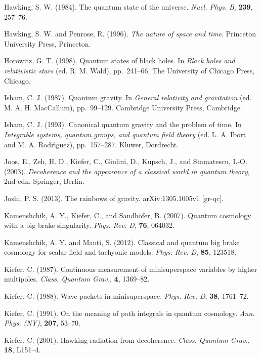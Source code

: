 \documentclass[12pt]{article}
\begin{document}
\bibitem{} Hawking, S. W. (1984). The quantum state of the universe.
           {\em Nucl. Phys. B}, {\bf 239}, 257--76.

\bibitem{} Hawking, S. W. and Penrose, R. (1996). {\em The nature
           of space and time}. Princeton University Press, Princeton.

\bibitem{} Horowitz, G. T. (1998). Quantum states of black holes. 
           In {\em Black holes and relativistic stars} (ed. R. M. Wald),
           pp.~241--66. The University of Chicago Press, Chicago.


\bibitem{} Isham, C. J. (1987). Quantum gravity. In {\em General
           relativity and gravitation}
           (ed. M. A. H. MacCallum), pp.~99--129. Cambridge University
           Press, Cambridge.

\bibitem{} Isham, C. J. (1993). Canonical quantum gravity and the problem of
           time. In {\em Integrable systems, quantum groups, and
           quantum field theory} (ed. L. A. Ibort and M. A. Rodr\'{\i}guez),
           pp.~157--287. Kluwer, Dordrecht.


\bibitem{} Joos, E., Zeh, H. D., Kiefer, C., Giulini, D., Kupsch, J., 
           and Stamatescu, I.-O. (2003). {\em Decoherence and the
           appearance of a classical world in quantum theory}, 2nd
           edn. Springer, Berlin.

\bibitem{} Joshi, P. S. (2013). The rainbows of
  gravity. arXiv:1305.1005v1 [gr-qc].

\bibitem{} Kamenshchik, A. Y., Kiefer, C., and Sandh\"ofer, B. (2007).
           Quantum cosmology with a big-brake singularity.
           {\em Phys. Rev. D}, {\bf 76}, 064032.

\bibitem{} Kamenshchik, A. Y. and Manti, S. (2012). Classical and
  quantum big brake cosmology for scalar field and tachyonic models.
 {\em Phys. Rev. D}, {\bf 85}, 123518.

\bibitem{} Kiefer, C. (1987). Continuous measurement of minisuperspace
           variables by higher multipoles. {\em Class. Quantum Grav.},
           {\bf 4}, 1369--82.

\bibitem{} Kiefer, C. (1988). Wave packets in minisuperspace.
           {\em Phys. Rev. D}, {\bf 38}, 1761--72.

\bibitem{} Kiefer, C. (1991). On the meaning of path integrals in
            quantum cosmology. {\em Ann. Phys. (NY)}, {\bf 207}, 53--70.

\bibitem{} Kiefer, C. (2001). Hawking radiation from
  decoherence. {\em Class. Quantum Grav.}, {\bf 18}, L151--4.
\end{document}
